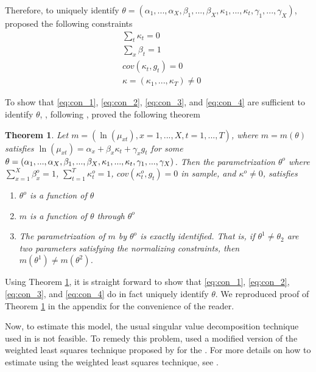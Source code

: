 \documentclass[AER, draftmode]{AEA}
\newtheorem{theorem}{Theorem}[section]
\begin{document}
Therefore, to uniquely identify $\theta = (\alpha_1, ..., \alpha_X, \beta_1, ..., \beta_X, \kappa_1, ..., \kappa_t, \gamma_1,..., \gamma_X)$, \cite{Niu2014} proposed the following constraints
\begin{align} \label{eq:con_1}
& \sum_t \kappa_t = 0 \\ \label{eq:con_2}
& \sum_x \beta_t = 1 \\ \label{eq:con_3}
& cov(\kappa_t, g_t) = 0 \\ \label{eq:con_4}
& \kappa = (\kappa_1,..., \kappa_T) \neq 0
\end{align}

To show that \ref{eq:con_1}, \ref{eq:con_2}, \ref{eq:con_3}, and \ref{eq:con_4} are sufficient to identify $\theta$, \cite{Niu2014}, following \cite{Nielsen2010}, proved the following theorem 
\begin{theorem}\label{the:1}
	Let $m = (\ln(\mu_{xt}), x = 1,..., X, t = 1, ..., T)$, where $m = m(\theta)$ satisfies $\ln(\mu_{xt}) = \alpha_x + \beta_x \kappa_t + \gamma_x g_t$ for some $\theta = (\alpha_1, ..., \alpha_X, \beta_1, ..., \beta_X, \kappa_1, ..., \kappa_t, \\ \gamma_1,..., \gamma_X)$. Then the parametrization $\theta^o$ where $\sum_{x=1}^{X} \beta_x^o = 1$, $\sum_{t=1}^{T} \kappa_t^o = 1$, $cov(\kappa_t^o, g_t)=0$ in sample, and $\kappa^o \neq 0$, satisfies
	\begin{enumerate}
		\item[(i)] $\theta^o$ is a function of $\theta$
		\item[(ii)] $m$ is a function of $\theta$ through $\theta^o$
		\item[(iii)] The parametrization of $m$ by $\theta^o$ is exactly identified. That is, if $\theta^1 \neq \theta_2$ are two parameters satisfying the normalizing constraints, then $m(\theta^1) \neq m(\theta^2)$.
	\end{enumerate}
\end{theorem}

Using Theorem \ref{the:1}, it is straight forward to show that \ref{eq:con_1}, \ref{eq:con_2}, \ref{eq:con_3}, and \ref{eq:con_4} do in fact uniquely identify $\theta$. We reproduced \cite{Niu2014} proof of Theorem \ref{the:1} in the appendix for the convenience of the reader.

Now, to estimate this model, the usual singular value decomposition technique used in \cite{Lee1992} is not feasible. To remedy this problem, \cite{Niu2014} used a modified version of the weighted least squares technique proposed by \cite{Wilmoth1993} for the \cite{Lee1992}. For more details on how to estimate using the weighted least squares technique, see \cite{Wilmoth1993}.
\end{document}
